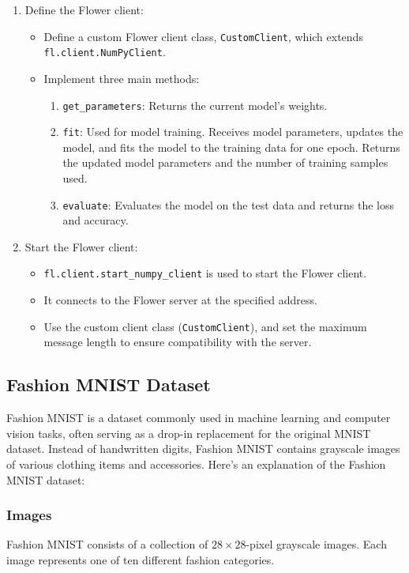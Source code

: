 \documentclass{article}
\begin{document}
\begin{enumerate}
    \item Define the Flower client:
    \begin{itemize}
        \item Define a custom Flower client class, \texttt{CustomClient}, which extends \texttt{fl.client.NumPyClient}.
        \item Implement three main methods:
        \begin{enumerate}
            \item \texttt{get\_parameters}: Returns the current model's weights.
            \item \texttt{fit}: Used for model training. Receives model parameters, updates the model, and fits the model to the training data for one epoch. Returns the updated model parameters and the number of training samples used.
            \item \texttt{evaluate}: Evaluates the model on the test data and returns the loss and accuracy.
        \end{enumerate}
    \end{itemize}
    \item Start the Flower client:
    \begin{itemize}
        \item \texttt{fl.client.start\_numpy\_client} is used to start the Flower client.
        \item It connects to the Flower server at the specified address.
        \item Use the custom client class (\texttt{CustomClient}), and set the maximum message length to ensure compatibility with the server.
    \end{itemize}
\end{enumerate}

\subsection{Fashion MNIST Dataset}
Fashion MNIST is a dataset commonly used in machine learning and computer vision tasks, often serving as a drop-in replacement for the original MNIST dataset. Instead of handwritten digits, Fashion MNIST contains grayscale images of various clothing items and accessories. Here's an explanation of the Fashion MNIST dataset:

\subsubsection{Images}
Fashion MNIST consists of a collection of \(28 \times 28\)-pixel grayscale images. Each image represents one of ten different fashion categories.
\end{document}
